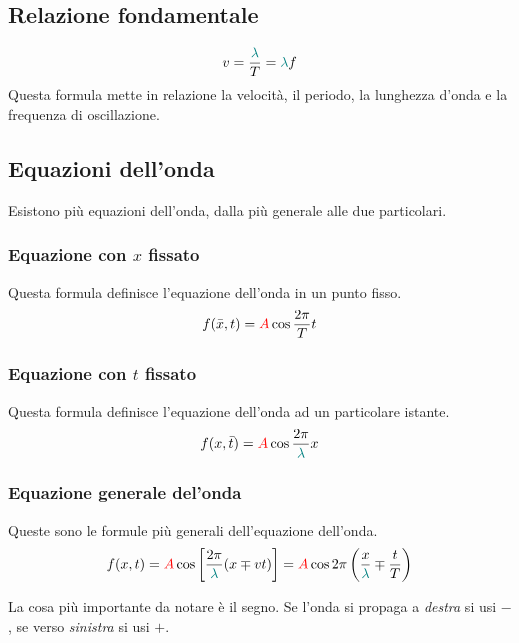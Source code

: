 \subsection{Relazione fondamentale}
\begin{equation*}
  v = \frac{\mathcolor{teal}{\lambda}}{T} = \mathcolor{teal}{\lambda}f
\end{equation*}
Questa formula mette in relazione la velocità, il periodo, la lunghezza d'onda e la frequenza
di oscillazione.

\subsection{Equazioni dell'onda}
Esistono più equazioni dell'onda, dalla più generale alle due particolari.

\subsubsection{Equazione con $x$ fissato}
Questa formula definisce l'equazione dell'onda in un punto fisso.
\begin{equation*}
  f(\bar{x}, t) = \mathcolor{red}{A}\cos\frac{2\pi}{T}t
\end{equation*}

\subsubsection{Equazione con $t$ fissato}
Questa formula definisce l'equazione dell'onda ad un particolare istante.
\begin{equation*}
  f(x, \bar{t}) = \mathcolor{red}{A} \cos\frac{2\pi}{\mathcolor{teal}{\lambda}}x
\end{equation*}

\subsubsection{Equazione generale del'onda}
Queste sono le formule più generali dell'equazione dell'onda.
\begin{equation*}
  f(x, t) = \mathcolor{red}{A}\cos\left[\frac{2\pi}{\mathcolor{teal}{\lambda}}(x\mp vt)\right] =
  \mathcolor{red}{A}\cos2\pi\left(\frac{x}{\mathcolor{teal}{\lambda}}\mp\frac{t}{T}\right)
\end{equation*}

La cosa più importante da notare è il segno. Se l'onda si propaga a \emph{destra} si usi $-$, se
verso \emph{sinistra} si usi $+$.

